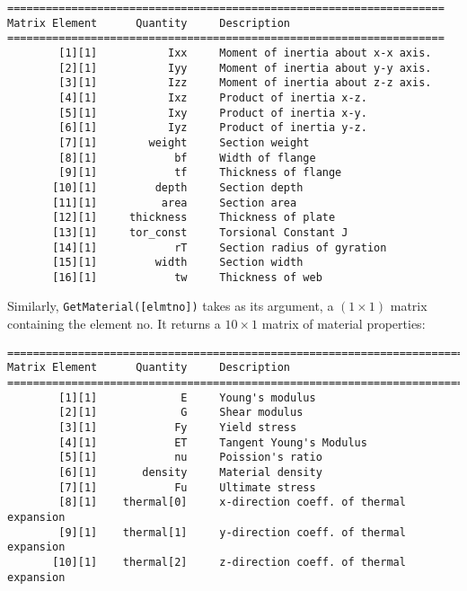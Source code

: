\begin{footnotesize}
\begin{verbatim}
====================================================================
Matrix Element      Quantity     Description 
====================================================================
        [1][1]           Ixx     Moment of inertia about x-x axis.
        [2][1]           Iyy     Moment of inertia about y-y axis.
        [3][1]           Izz     Moment of inertia about z-z axis.
        [4][1]           Ixz     Product of inertia x-z.
        [5][1]           Ixy     Product of inertia x-y.
        [6][1]           Iyz     Product of inertia y-z.
        [7][1]        weight     Section weight
        [8][1]            bf     Width of flange
        [9][1]            tf     Thickness of flange
       [10][1]         depth     Section depth
       [11][1]          area     Section area
       [12][1]     thickness     Thickness of plate
       [13][1]     tor_const     Torsional Constant J
       [14][1]            rT     Section radius of gyration
       [15][1]         width     Section width
       [16][1]            tw     Thickness of web
\end{verbatim}
\end{footnotesize}

\vspace{0.15 in}\noindent
Similarly, {\tt GetMaterial([elmtno])} takes as its argument, a $(1 \times 1)$
matrix containing the element no. It returns a
{\tt $10 \times 1$} matrix of material properties:

\begin{footnotesize}
\begin{verbatim}
========================================================================
Matrix Element      Quantity     Description 
========================================================================
        [1][1]             E     Young's modulus
        [2][1]             G     Shear modulus
        [3][1]            Fy     Yield stress
        [4][1]            ET     Tangent Young's Modulus
        [5][1]            nu     Poission's ratio
        [6][1]       density     Material density
        [7][1]            Fu     Ultimate stress
        [8][1]    thermal[0]     x-direction coeff. of thermal expansion
        [9][1]    thermal[1]     y-direction coeff. of thermal expansion
       [10][1]    thermal[2]     z-direction coeff. of thermal expansion
\end{verbatim}
\end{footnotesize}

